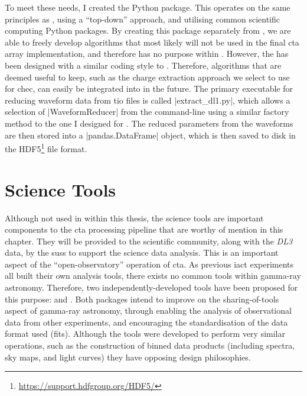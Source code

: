 To meet these needs, I created the  Python package. This operates on the same principles as , using a ``top-down'' approach, and utilising common scientific computing Python packages. By creating this package separately from , we are able to freely develop algorithms that most likely will not be used in the final \gls{cta} array implementation, and therefore has no purpose within .  However, the  has been designed with a similar coding style to . Therefore, algorithms that are deemed useful to keep, such as the charge extraction approach we select to use for \gls{chec}, can easily be integrated into  in the future. The primary executable for reducing waveform data from \gls{tio} files is called |extract_dl1.py|, which allows a selection of |WaveformReducer| from the command-line using a similar factory method to the one I designed for . The reduced parameters from the waveforms are then stored into a |pandas.DataFrame| object, which is then saved to disk in the HDF5\footnote{\url{https://support.hdfgroup.org/HDF5/}} file format.

\section{Science Tools}

Although not used in within this thesis, the science tools are important components to the \gls{cta} processing pipeline that are worthy of mention in this chapter. They will be provided to the scientific community, along with the \textit{DL3} data, by the \gls{suss} to support the science data analysis. This is an important aspect of the ``open-observatory'' operation of \gls{cta}.  As previous \gls{iact} experiments all built their own analysis tools, there exists no common tools within gamma-ray astronomy. Therefore, two independently-developed tools have been proposed for this purpose:  and . Both packages intend to improve on the sharing-of-tools aspect of gamma-ray astronomy, through enabling the analysis of observational data from other experiments, and encouraging the standardisation of the data format used (\gls{fits}). Although the tools were developed to perform very similar operations, such as the construction of binned data products (including spectra, sky maps, and light curves) they have opposing design philosophies.


